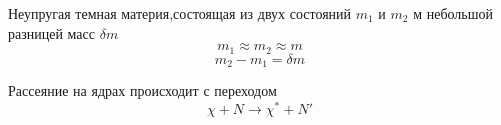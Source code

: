 Неупругая темная материя,состоящая из двух состояний $m_1$ и $m_2$ м небольшой разницей масс $\delta m$
\begin{equation*}
	m_1 \approx m_2 \approx m
\end{equation*}	
\begin{equation*}
	m_2 - m_1 = \delta m
\end{equation*}

Рассеяние на ядрах происходит с переходом
\begin{equation*}
	\chi + N \rightarrow \chi^* + N'
\end{equation*}	
